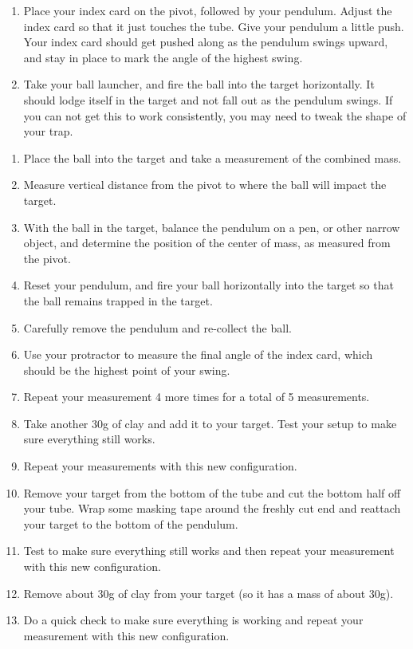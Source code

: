 

\begin{enumerate}
    \item Place your index card on the pivot, followed by your pendulum.  Adjust the index card so that it just touches the tube.  Give your pendulum a little push.  Your index card should get pushed along as the pendulum swings upward, and stay in place to mark the angle of the highest swing.
    \item Take your ball launcher, and fire the ball into the target horizontally.  It should lodge itself in the target and not fall out as the pendulum swings.  If you can not get this to work consistently, you may need to tweak the shape of your trap.
\end{enumerate}
    

\begin{enumerate}
    \item Place the ball into the target and take a measurement of the combined mass.
    \item Measure vertical distance from the pivot to where the ball will impact the target.
    \item With the ball in the target, balance the pendulum on a pen, or other narrow object, and determine the position of the center of mass, as measured from the pivot.
    \item Reset your pendulum, and fire your ball horizontally into the target so that the ball remains trapped in the target.
    \item Carefully remove the pendulum and re-collect the ball.
    \item Use your protractor to measure the final angle of the index card, which should be the highest point of your swing.
    \item Repeat your measurement 4 more times for a total of 5 measurements.
    \item Take another 30g of clay and add it to your target. Test your setup to make sure everything still works.
    \item Repeat your measurements with this new configuration.
    \item Remove your target from the bottom of the tube and cut the bottom half off your tube.  Wrap some masking tape around the freshly cut end and reattach your target to the bottom of the pendulum.
    \item Test to make sure everything still works and then repeat your measurement with this new configuration.
    \item Remove about 30g of clay from your target (so it has a mass of about 30g).
    \item Do a quick check to make sure everything is working and repeat your measurement with this new configuration.
\end{enumerate}

